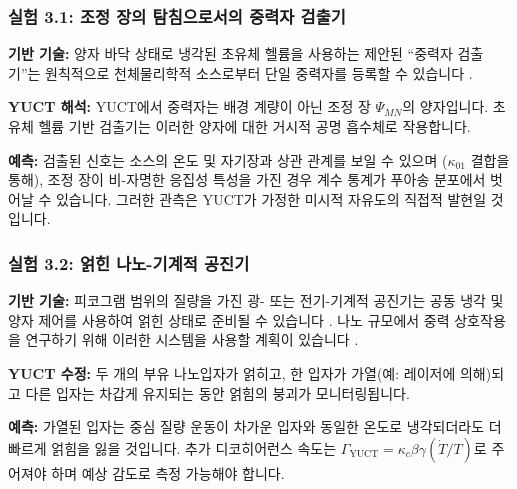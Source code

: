 \documentclass[11pt,a4paper]{article}
\begin{document}
	\subsubsection{실험 3.1: 조정 장의 탐침으로서의 중력자 검출기}
	
	\textbf{기반 기술:} 양자 바닥 상태로 냉각된 초유체 헬륨을 사용하는 제안된 ``중력자 검출기''는 원칙적으로 천체물리학적 소스로부터 단일 중력자를 등록할 수 있습니다 \cite{Berezin2025}.
	
	\textbf{YUCT 해석:} YUCT에서 중력자는 배경 계량이 아닌 조정 장 $\Psi_{MN}$의 양자입니다. 초유체 헬륨 기반 검출기는 이러한 양자에 대한 거시적 공명 흡수체로 작용합니다.
	
	\textbf{예측:} 검출된 신호는 소스의 온도 및 자기장과 상관 관계를 보일 수 있으며 ($\kappa_{01}$ 결합을 통해), 조정 장이 비-자명한 응집성 특성을 가진 경우 계수 통계가 푸아송 분포에서 벗어날 수 있습니다. 그러한 관측은 YUCT가 가정한 미시적 자유도의 직접적 발현일 것입니다.
	
	\subsubsection{실험 3.2: 얽힌 나노-기계적 공진기}
	
	\textbf{기반 기술:} 피코그램 범위의 질량을 가진 광- 또는 전기-기계적 공진기는 공동 냉각 및 양자 제어를 사용하여 얽힌 상태로 준비될 수 있습니다 \cite{Aspelmeyer2014}. 나노 규모에서 중력 상호작용을 연구하기 위해 이러한 시스템을 사용할 계획이 있습니다 \cite{Geraci2010}.
	
	\textbf{YUCT 수정:} 두 개의 부유 나노입자가 얽히고, 한 입자가 가열(예: 레이저에 의해)되고 다른 입자는 차갑게 유지되는 동안 얽힘의 붕괴가 모니터링됩니다.
	
	\textbf{예측:} 가열된 입자는 중심 질량 운동이 차가운 입자와 동일한 온도로 냉각되더라도 더 빠르게 얽힘을 잃을 것입니다. 추가 디코히어런스 속도는 $\Gamma_{\mathrm{YUCT}} = \kappa_c \beta\gamma (\dot{T}/T)$로 주어져야 하며 예상 감도로 측정 가능해야 합니다.
	
\end{document}

